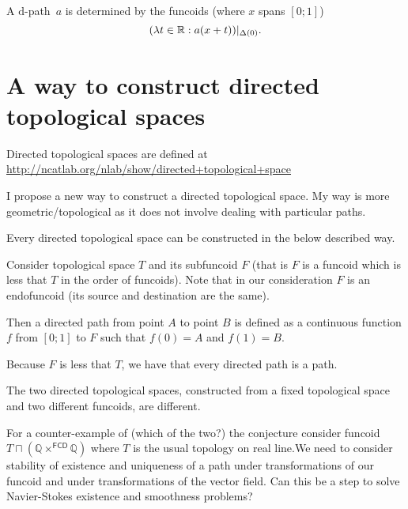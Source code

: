 \begin{conjecture}
A $\mathrm{d}$-path~$a$ is determined by the funcoids (where $x$ spans $[0;1]$)
\[ (\lambda t\in\mathbb{R}:a(x+t))|_{\Delta(0)}. \]
\end{conjecture}

\section{A way to construct directed topological spaces}


Directed topological spaces are defined at\\
\url{http://ncatlab.org/nlab/show/directed+topological+space}

I propose a new way to construct a directed topological space. My way is more geometric/topological as it does not involve dealing with particular paths.

\begin{conjecture}
Every directed topological space can be constructed in the below described way.
\end{conjecture}

Consider topological space $T$ and its subfuncoid $F$ (that is $F$ is a funcoid which is less that $T$ in the order of funcoids).
Note that in our consideration $F$ is an endofuncoid (its source and destination are the same).

Then a directed path from point $A$ to point $B$ is defined as a continuous function $f$ from $[0;1]$ to $F$ such that $f(0)=A$ and $f(1)=B$.

Because $F$ is less that $T$, we have that every directed path is a path.

\begin{conjecture}
The two directed topological spaces, constructed from a fixed topological space and two different funcoids,
are different.
\end{conjecture}

For a counter-example of (which of the two?) the conjecture consider funcoid $T\sqcap(\mathbb{Q}\times^{\mathsf{FCD}}\mathbb{Q})$
where $T$ is the usual topology on real line.We need to consider stability of existence and uniqueness of a path under transformations of our funcoid and
under transformations of the vector field. Can this be a step to solve Navier-Stokes existence and smoothness problems?

